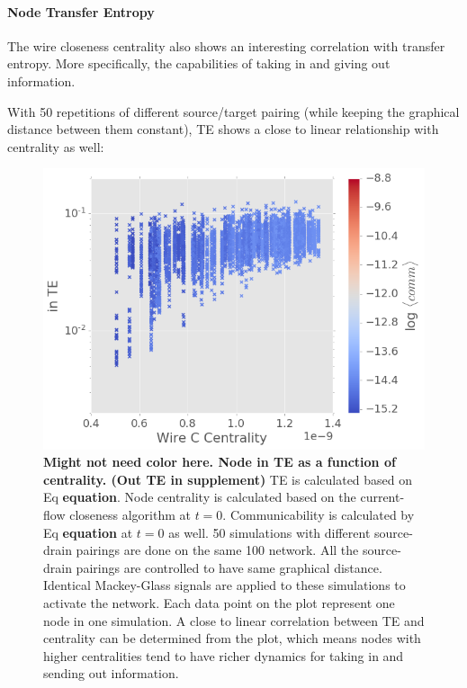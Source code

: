 \documentclass[%
 reprint,
 amsmath,amssymb,
 aps,
]{revtex4-2}
\begin{document}
\paragraph{Node Transfer Entropy}
The wire closeness centrality also shows an interesting correlation with transfer entropy. More specifically, the capabilities of taking in and giving out information. 

With 50 repetitions of different source/target pairing (while keeping the graphical distance between them constant), TE shows a close to linear relationship with centrality as well:

\begin{figure}[h]
	\centering
	\includegraphics[width=1\linewidth]{figure/in_TE}
	\caption{\textbf{Might not need color here. Node in TE as a function of centrality. (Out TE in  supplement)} TE is calculated based on Eq \textbf{equation}. Node centrality is calculated based on the current-flow closeness algorithm at $t = 0$. Communicability is calculated by Eq \textbf{equation} at $t = 0$ as well. 50 simulations with different source-drain pairings are done on the same 100 network. All the source-drain pairings are controlled to have same graphical distance. Identical Mackey-Glass signals are applied to these simulations to activate the network. Each data point on the plot represent one node in one simulation. A close to linear correlation between TE and centrality can be determined from the plot, which means nodes with higher centralities tend to have richer dynamics for taking in and sending out information.}
	\label{fig:in_te}
\end{figure}
\end{document}
